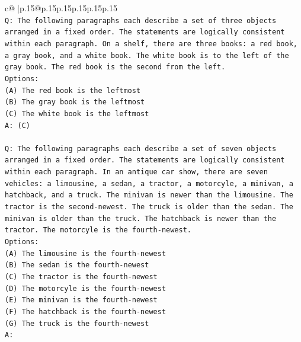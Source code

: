 \documentclass{article}
\begin{document}
{\begin{supertabular}{c@{$\;$}|p{.15\linewidth}@{}p{.15\linewidth}p{.15\linewidth}p{.15\linewidth}p{.15\linewidth}p{.15\linewidth}}
{{{\\ 
\texttt{Q: The following paragraphs each describe a set of three objects arranged in a fixed order. The statements are logically consistent within each paragraph. On a shelf, there are three books: a red book, a gray book, and a white book. The white book is to the left of the gray book. The red book is the second from the left.} \\
\texttt{Options:} \\
\texttt{(A) The red book is the leftmost} \\
\texttt{(B) The gray book is the leftmost} \\
\texttt{(C) The white book is the leftmost} \\
\texttt{A: (C)} \\
\\ 
\texttt{Q: The following paragraphs each describe a set of seven objects arranged in a fixed order. The statements are logically consistent within each paragraph. In an antique car show, there are seven vehicles: a limousine, a sedan, a tractor, a motorcyle, a minivan, a hatchback, and a truck. The minivan is newer than the limousine. The tractor is the second{-}newest. The truck is older than the sedan. The minivan is older than the truck. The hatchback is newer than the tractor. The motorcyle is the fourth{-}newest.} \\
\texttt{Options:} \\
\texttt{(A) The limousine is the fourth{-}newest} \\
\texttt{(B) The sedan is the fourth{-}newest} \\
\texttt{(C) The tractor is the fourth{-}newest} \\
\texttt{(D) The motorcyle is the fourth{-}newest} \\
\texttt{(E) The minivan is the fourth{-}newest} \\
\texttt{(F) The hatchback is the fourth{-}newest} \\
\texttt{(G) The truck is the fourth{-}newest} \\
\texttt{A:} \\
            }
        }
    }
     \\ \\


\end{supertabular}}
\end{document}
